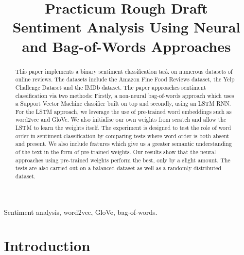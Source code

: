 \documentclass[conference]{IEEEtran}
\begin{document}
\title{\LARGE Practicum Rough Draft \\ Sentiment Analysis Using Neural and Bag-of-Words Approaches}
\author{
}

\maketitle

\begin{abstract}
This paper implements a binary sentiment classification task on numerous datasets of online reviews. The datasets include the Amazon Fine Food Reviews dataset, the Yelp Challenge Dataset and the IMDb dataset. The paper approaches sentiment classification via two methods: Firstly, a non-neural bag-of-words approach which uses a Support Vector Machine classifier built on top and secondly, using an LSTM RNN. For the LSTM approach, we leverage the use of pre-trained word embeddings such as word2vec and GloVe. We also initialise our own weights from scratch and allow the LSTM to learn the weights itself. The experiment is designed to test the role of word order in sentiment classification by comparing tests where word order is both absent and present. We also include features which give us a greater semantic understanding of the text in the form of pre-trained weights. Our results show that the neural approaches using pre-trained weights perform the best, only by a slight amount. The tests are also carried out on a balanced dataset as well as a randomly distributed dataset.
\end{abstract}

\begin{keywords}
Sentiment analysis, word2vec, GloVe, bag-of-words.
\end{keywords}

\section{Introduction}
\end{document}
